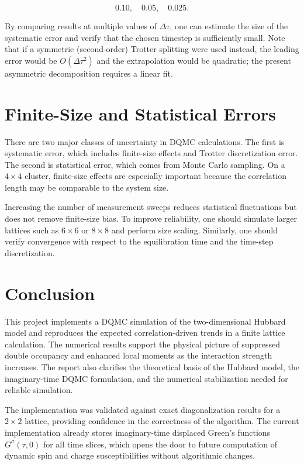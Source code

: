 \documentclass[9pt,a4paper,twocolumn,twoside]{rho-class/rho}
\begin{document}
\[
0.10,\quad 0.05,\quad 0.025.
\]

By comparing results at multiple values of $\Delta\tau$, one can estimate the size of the systematic error and verify that the chosen timestep is sufficiently small. Note that if a symmetric (second-order) Trotter splitting were used instead, the leading error would be $O(\Delta\tau^2)$ and the extrapolation would be quadratic; the present asymmetric decomposition requires a linear fit.

\section{Finite-Size and Statistical Errors}

There are two major classes of uncertainty in DQMC calculations. The first is systematic error, which includes finite-size effects and Trotter discretization error. The second is statistical error, which comes from Monte Carlo sampling. On a $4\times4$ cluster, finite-size effects are especially important because the correlation length may be comparable to the system size.

Increasing the number of measurement sweeps reduces statistical fluctuations but does not remove finite-size bias. To improve reliability, one should simulate larger lattices such as $6\times6$ or $8\times8$ and perform size scaling. Similarly, one should verify convergence with respect to the equilibration time and the time-step discretization.

\section{Conclusion}

This project implements a DQMC simulation of the two-dimensional Hubbard model and reproduces the expected correlation-driven trends in a finite lattice calculation. The numerical results support the physical picture of suppressed double occupancy and enhanced local moments as the interaction strength increases. The report also clarifies the theoretical basis of the Hubbard model, the imaginary-time DQMC formulation, and the numerical stabilization needed for reliable simulation.

The implementation was validated against exact diagonalization results for a $2\times2$ lattice, providing confidence in the correctness of the algorithm. The current implementation already stores imaginary-time displaced Green's functions $G^\sigma(\tau, 0)$ for all time slices, which opens the door to future computation of dynamic spin and charge susceptibilities without algorithmic changes.
\end{document}
